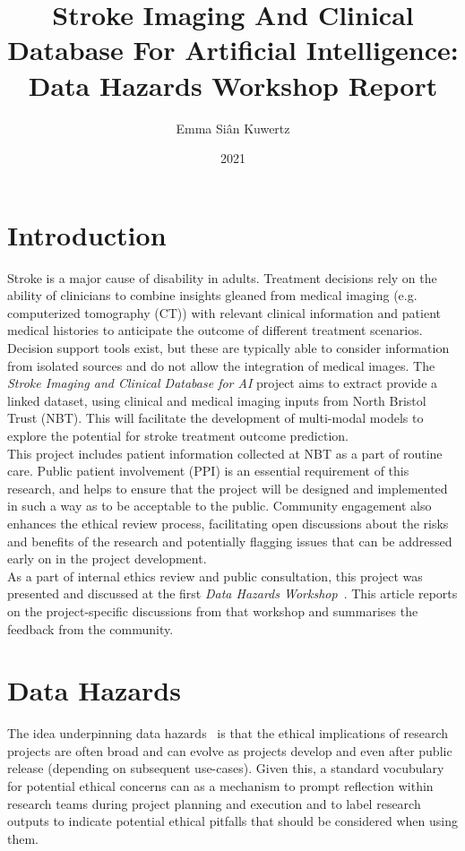 \documentclass{article}
\title{Stroke Imaging And Clinical Database For Artificial
  Intelligence: Data Hazards
  Workshop Report}
\author{Emma Si\^{a}n Kuwertz}
\affil{Jean Golding Institute, University of Bristol}
\date{2021}
\begin{document}
\maketitle
\section{Introduction}

Stroke is a major cause of disability in adults. Treatment
decisions rely on the ability of clinicians to combine insights
gleaned from medical imaging (e.g. computerized tomography (CT)) with
relevant clinical information and patient medical histories to anticipate the outcome of different treatment
scenarios. Decision support tools exist, but these are typically able
to consider information from isolated sources and do not allow the
integration of medical images. The \textit{Stroke Imaging and Clinical
Database for AI} project aims to extract provide a linked dataset,
using clinical and medical imaging inputs from North Bristol Trust (NBT). 
This will facilitate the development of multi-modal models to explore the potential for stroke treatment outcome
prediction.\\

This project includes patient information collected at NBT as a part
of routine care. Public patient involvement (PPI) is an essential
requirement of this research, and helps to ensure that the project
will be designed and implemented in such a way as to be acceptable to
the public. Community engagement also enhances the ethical
review process, facilitating open discussions about the risks and
benefits of the research and potentially flagging issues that can be
addressed early on in the project development.\\

As a part of internal ethics review and public consultation, this
project was presented and discussed at the first \textit{Data Hazards
  Workshop}~\cite{data-hazards-workshop}.
This article reports on the project-specific discussions from that
workshop and summarises the feedback from the community.

\section{Data Hazards}
\label{sec:data-labels}
The idea underpinning data hazards~\cite{data-hazards} is that the ethical implications of
research projects are often broad and can evolve as projects
develop and even after public release (depending on subsequent
use-cases). Given this, a standard vocubulary for potential ethical
concerns can as a mechanism
to prompt reflection within research teams during project planning and
execution and to
label research outputs to indicate potential ethical pitfalls that should be
considered when using them. \\
\end{document}
